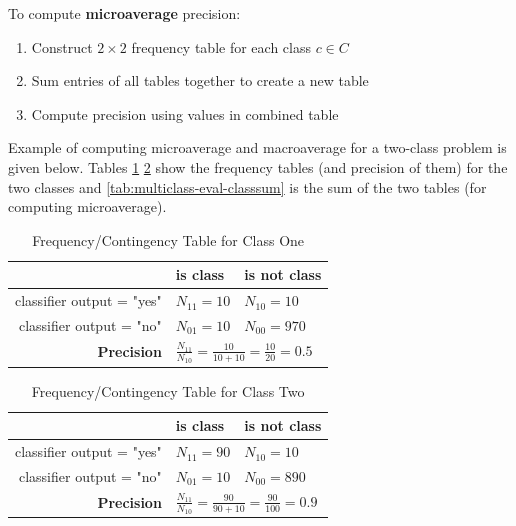 \documentclass{article}
\begin{document}
To compute \textbf{microaverage} precision:
\begin{enumerate}
	\item Construct $2 \times 2$ frequency table for each class $c \in C$
	\item Sum entries of all tables together to create a new table
	\item Compute precision using values in combined table
\end{enumerate}

Example of computing microaverage and macroaverage for a two-class problem is given below. Tables \ref{tab:multiclass-eval-class1} \ref{tab:multiclass-eval-class2} show the frequency tables (and precision of them) for the two classes and \ref{tab:multiclass-eval-classsum} is the sum of the two tables (for computing microaverage).

\begin{table}[H]
	\centering
	\begin{tabular}{|r|l|l|}
		\hline
		& is class & is not class \\
		\hline
		classifier output = "yes" & $N_{11} = 10$ & $N_{10} = 10$ \\
		classifier output = "no" & $N_{01} = 10$ & $N_{00} = 970$ \\
		\hline
		\textbf{Precision} & \multicolumn{2}{l|}{
			$\frac{N_{11}}{N_{10}} = \frac{10}{10 + 10} = \frac{10}{20} = 0.5$
		} \\
		\hline
	\end{tabular}
	\caption{Frequency/Contingency Table for Class One}
	\label{tab:multiclass-eval-class1}
\end{table}

\begin{table}[H]
	\centering
	\begin{tabular}{|r|l|l|}
		\hline
		& is class & is not class \\
		\hline
		classifier output = "yes" & $N_{11} = 90$ & $N_{10} = 10$ \\
		classifier output = "no" & $N_{01} = 10$ & $N_{00} = 890$ \\
		\hline
		\textbf{Precision} & \multicolumn{2}{l|}{
			$\frac{N_{11}}{N_{10}} = \frac{90}{90 + 10} = \frac{90}{100} = 0.9$
		} \\
		\hline
	\end{tabular}
	\caption{Frequency/Contingency Table for Class Two}
	\label{tab:multiclass-eval-class2}
\end{table}
\end{document}
